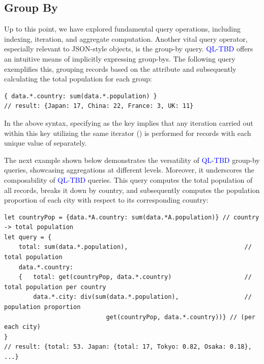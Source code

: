 \documentclass[runningheads]{llncs}
\newcommand{\lang}{\textcolor{blue}{QL-TBD}}
\begin{document}


\subsection{Group By}
Up to this point, we have explored fundamental query operations, including indexing,
iteration, and aggregate computation.
Another vital query operator, especially relevant to JSON-style objects,
is the group-by query.
\lang{} offers an intuitive means of implicitly expressing group-bys.
The following query exemplifies this, grouping records based on the
 attribute and subsequently calculating the total population
for each group:

\begin{lstlisting}[style=JavaScript, columns=flexible, numbers=none]
{ data.*.country: sum(data.*.population) }
// result: {Japan: 17, China: 22, France: 3, UK: 11}
\end{lstlisting}

In the above syntax, specifying  as the key implies
that any iteration carried out within this key utilizing the same
iterator (\inline{*}) is performed for records with each unique value of 
separately.

The next example shown below demonstrates the versatility of \lang{} group-by queries, showcasing
aggregations at different levels.
Moreover, it underscores the composability of \lang{} queries.
This query computes the total population of all records, breaks it down by country,
and subsequently computes the population proportion of each city with respect to its
corresponding country:

\begin{lstlisting}[style=JavaScript, columns=flexible, numbers=none]
let countryPop = {data.*A.country: sum(data.*A.population)} // country -> total population
let query = { 
    total: sum(data.*.population),                                // total population
    data.*.country:
    {   total: get(countryPop, data.*.country)                    // total population per country
        data.*.city: div(sum(data.*.population),                  // population proportion
                            get(countryPop, data.*.country))} // (per each city)
}
// result: {total: 53. Japan: {total: 17, Tokyo: 0.82, Osaka: 0.18}, ...}
\end{lstlisting}
\end{document}
